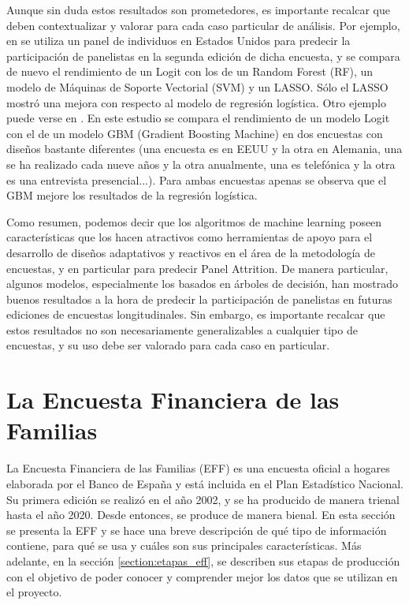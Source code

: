 Aunque sin duda estos resultados son prometedores, es importante recalcar que deben contextualizar y valorar para cada caso particular de análisis. Por ejemplo, en \cite{liu2020using} se utiliza un panel de individuos en Estados Unidos para predecir la participación de panelistas en la segunda edición de dicha encuesta, y se compara de nuevo el rendimiento de un Logit con los de un Random Forest (RF), un modelo de Máquinas de Soporte Vectorial (SVM) y un LASSO. Sólo el LASSO mostró una mejora con respecto al modelo de regresión logística. Otro ejemplo puede verse en \cite{jankowsky2022validation}. En este estudio se compara el rendimiento de un modelo Logit con el de un modelo GBM (Gradient Boosting Machine) en dos encuestas con diseños bastante diferentes (una encuesta es en EEUU y la otra en Alemania, una se ha realizado cada nueve años y la otra anualmente, una es telefónica y la otra es una entrevista presencial...). Para ambas encuestas apenas se observa que el GBM mejore los resultados de la regresión logística.

Como resumen, podemos decir que los algoritmos de machine learning poseen características que los hacen atractivos como herramientas de apoyo para el desarrollo de diseños adaptativos y reactivos en el área de la metodología de encuestas, y en particular para predecir Panel Attrition. De manera particular, algunos modelos, especialmente los basados en árboles de decisión, han mostrado buenos resultados a la hora de predecir la participación de panelistas en futuras ediciones de encuestas longitudinales. Sin embargo, es importante recalcar que estos resultados no son necesariamente generalizables a cualquier tipo de encuestas, y su uso debe ser valorado para cada caso en particular.

\section{La Encuesta Financiera de las Familias}
\label{section:eff}

La Encuesta Financiera de las Familias (EFF) es una encuesta oficial a hogares elaborada por el Banco de España y está incluida en el Plan Estadístico Nacional. Su primera edición se realizó en el año 2002, y se ha producido de manera trienal hasta el año 2020. Desde entonces, se produce de manera bienal. En esta sección se presenta la EFF y se hace una breve descripción de qué tipo de información contiene, para qué se usa y cuáles son sus principales características. Más adelante, en la sección \ref{section:etapas_eff}, se describen sus etapas de producción con el objetivo de poder conocer y comprender mejor los datos que se utilizan en el proyecto.

